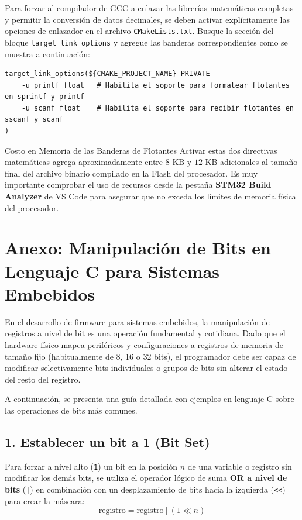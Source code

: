 \documentclass[
10pt, %
a4paper, %
oneside, %
headinclude,footinclude, %
BCOR5mm, %
]{scrartcl}
\begin{document}
Para forzar al compilador de GCC a enlazar las librerías matemáticas completas y permitir la conversión de datos decimales, se deben activar explícitamente las opciones de enlazador en el archivo \texttt{CMakeLists.txt}. Busque la sección del bloque \texttt{target\_link\_options} y agregue las banderas correspondientes como se muestra a continuación:

\begin{lstlisting}[style=CMakeStyle]
target_link_options(${CMAKE_PROJECT_NAME} PRIVATE
    -u_printf_float   # Habilita el soporte para formatear flotantes en sprintf y printf
    -u_scanf_float    # Habilita el soporte para recibir flotantes en sscanf y scanf
)
\end{lstlisting}

\begin{InfoBox}{Costo en Memoria de las Banderas de Flotantes}
	Activar estas dos directivas matemáticas agrega aproximadamente entre $8\text{ KB}$ y $12\text{ KB}$ adicionales al tamaño final del archivo binario compilado en la Flash del procesador. Es muy importante comprobar el uso de recursos desde la pestaña \textbf{STM32 Build Analyzer} de VS Code para asegurar que no exceda los límites de memoria física del procesador.
\end{InfoBox}

\newpage
\section*{Anexo: Manipulación de Bits en Lenguaje C para Sistemas Embebidos}

En el desarrollo de firmware para sistemas embebidos, la manipulación de registros a nivel de bit es una operación fundamental y cotidiana. Dado que el hardware físico mapea periféricos y configuraciones a registros de memoria de tamaño fijo (habitualmente de 8, 16 o 32 bits), el programador debe ser capaz de modificar selectivamente bits individuales o grupos de bits sin alterar el estado del resto del registro.

A continuación, se presenta una guía detallada con ejemplos en lenguaje C sobre las operaciones de bits más comunes.

\subsection*{1. Establecer un bit a 1 (Bit Set)}
Para forzar a nivel alto (\texttt{1}) un bit en la posición $n$ de una variable o registro sin modificar los demás bits, se utiliza el operador lógico de suma \textbf{OR a nivel de bits} (\texttt{|}) en combinación con un desplazamiento de bits hacia la izquierda (\texttt{<<}) para crear la máscara:
\begin{equation}
	\text{registro} = \text{registro} \ | \ (1 \ll n)
\end{equation}
\end{document}
